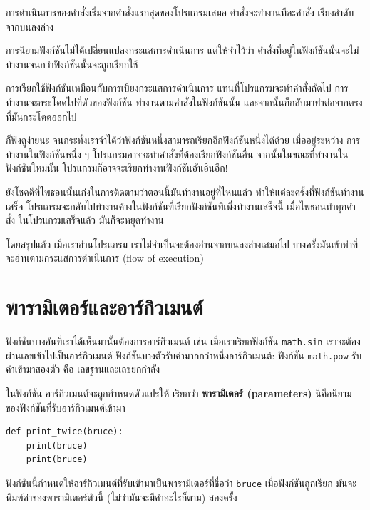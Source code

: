 การดำเนินการของคำสั่งเริ่มจากคำสั่งแรกสุดของโปรแกรมเสมอ
คำสั่งจะทำงานทีละคำสั่ง เรียงลำดับจากบนลงล่าง

การนิยามฟังก์ชันไม่ได้เปลี่ยนแปลงกระแสการดำเนินการ แต่ให้จำไว้ว่า
คำสั่งที่อยู่ในฟังก์ชันนั้นจะไม่ทำงานจนกว่าฟังก์ชันนั้นจะถูกเรียกใช้

การเรียกใช้ฟังก์ชันเหมือนกับการเบี่ยงกระแสการดำเนินการ แทนที่โปรแกรมจะทำคำสั่งถัดไป
การทำงานจะกระโดดไปที่ตัวของฟังก์ชัน ทำงานตามคำสั่งในฟังก์ชันนั้น 
และจากนั้นก็กลับมาทำต่อจากตรงที่มันกระโดดออกไป

ก็ฟังดูง่ายนะ จนกระทั่งเราจำได้ว่าฟังก์ชันหนึ่งสามารถเรียกอีกฟังก์ชันหนึ่งได้ด้วย  เมื่ออยู่ระหว่าง
การทำงานในฟังก์ชันหนึ่ง ๆ โปรแกรมอาจจะทำคำสั่งที่ต้องเรียกฟังก์ชันอื่น จากนั้นในขณะที่ทำงานใน
ฟังก์ชันใหม่นั้น โปรแกรมก็อาจจะเรียกทำงานฟังก์ชันอันอื่นอีก!

ยังโชคดีที่ไพธอนนั้นเก่งในการติดตามว่าตอนนี้มันทำงานอยู่ที่ไหนแล้ว ทำให้แต่ละครั้งที่ฟังก์ชันทำงานเสร็จ
โปรแกรมจะกลับไปทำงานค้างในฟังก์ชันที่เรียกฟังก์ชันที่เพิ่งทำงานเสร็จนี้ เมื่อไพธอนทำทุกคำสั่ง
ในโปรแกรมเสร็จแล้ว มันก็จะหยุดทำงาน

โดยสรุปแล้ว เมื่อเราอ่านโปรแกรม เราไม่จำเป็นจะต้องอ่านจากบนลงล่างเสมอไป
บางครั้งมันเข้าท่าที่จะอ่านตามกระแสการดำเนินการ (flow of execution)


\section{พารามิเตอร์และอาร์กิวเมนต์} %
\label{parameters}

ฟังก์ชันบางอันที่เราได้เห็นมานั้นต้องการอาร์กิวเมนต์ เช่น เมื่อเราเรียกฟังก์ชัน {\tt math.sin}
เราจะต้องผ่านเลขเข้าไปเป็นอาร์กิวเมนต์ ฟังก์ชันบางตัวรับค่ามากกว่าหนึ่งอาร์กิวเมนต์: 
ฟังก์ชัน {\tt math.pow} รับค่าเข้ามาสองตัว คือ เลขฐานและเลขยกกำลัง

ในฟังก์ชัน อาร์กิวเมนต์จะถูกกำหนดตัวแปรให้ เรียกว่า {\bf พารามิเตอร์ (parameters)}
นี่คือนิยามของฟังก์ชันที่รับอาร์กิวเมนต์เข้ามา

\begin{verbatim}
def print_twice(bruce):
    print(bruce)
    print(bruce)
\end{verbatim}
%
ฟังก์ชันนี้กำหนดให้อาร์กิวเมนต์ที่รับเข้ามาเป็นพารามิเตอร์ที่ชื่อว่า {\tt bruce}  เมื่อฟังก์ชันถูกเรียก
มันจะพิมพ์ค่าของพารามิเตอร์ตัวนี้ (ไม่ว่ามันจะมีค่าอะไรก็ตาม) สองครั้ง 

